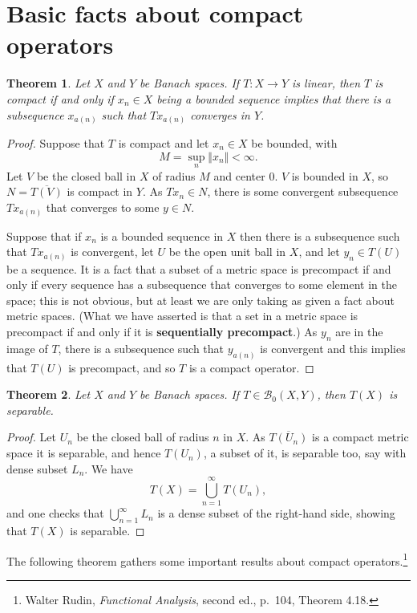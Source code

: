 \documentclass{article}
\newcommand{\norm}[1]{\Vert #1 \Vert}
\newtheorem{theorem}{Theorem}
\begin{document}
\section{Basic facts about compact operators}
\begin{theorem}
Let $X$ and $Y$ be Banach spaces.
If $T:X \to Y$ is linear, then $T$ is compact if and only if $x_n \in X$ being a bounded sequence implies that there
is a subsequence $x_{a(n)}$ such that $Tx_{a(n)}$ converges in $Y$.
\end{theorem}
\begin{proof}
Suppose that $T$ is compact and let $x_n \in X$ be bounded, with
\[
M = \sup_n \norm{x_n}<\infty.
\] 
Let $V$ be the closed ball in $X$ of radius $M$ and center $0$. $V$ is bounded in $X$,
so $N=\overline{T(V)}$ is compact in $Y$.
As $Tx_n \in N$, there is some convergent subsequence $Tx_{a(n)}$ that converges to some $y \in N$.

Suppose that if $x_n$ is a bounded sequence in $X$ then there is a subsequence such that $Tx_{a(n)}$ is convergent,  let $U$ be the open unit ball in $X$,
and let $y_n \in T(U)$ be a sequence. It is a fact that a subset of a metric space is precompact if and only if every sequence has a subsequence that converges to some
element in the space; this is not obvious, but at least we are only taking as given a fact about metric spaces. (What we have asserted is that a set in a metric space
is precompact if and only if it is \textbf{sequentially precompact}.) As $y_n$ are in the image of $T$, there is a subsequence such that $y_{a(n)}$ is convergent and
this implies that $T(U)$ is precompact, and so $T$ is a compact operator.
\end{proof}


\begin{theorem}
Let $X$ and $Y$ be Banach spaces. If $T \in \mathscr{B}_0(X,Y)$, then $T(X)$ is separable.
\end{theorem}
\begin{proof}
Let $U_n$ be the closed ball of radius $n$ in $X$. As $\overline{T(U_n)}$ is a compact metric space it is separable, and hence $T(U_n)$, a subset of it, is separable too, say with dense subset $L_n$. 
We have
\[
T(X) = \bigcup_{n=1}^\infty T(U_n),
\]
and one checks that $\bigcup_{n=1}^\infty L_n$ is a dense subset of the right-hand side, showing that $T(X)$ is separable.
\end{proof}


The following theorem gathers some important results about compact operators.\footnote{Walter Rudin, {\em Functional Analysis},
second ed., p.~104, Theorem 4.18.}
\end{document}
